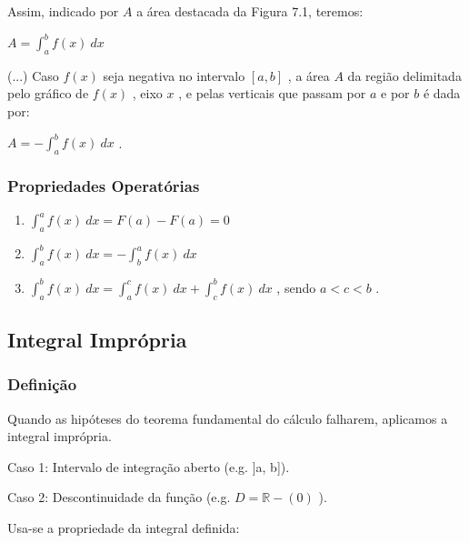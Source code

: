 			Assim, indicado por \textbf{$ A $} a área destacada da Figura 7.1, teremos:
			
			\bigskip

			{\LARGE $A = \int_{a}^{b} f(x) \ dx$}
	
			\bigskip
			
			(...) Caso $ f(x) $ seja negativa no intervalo $ [a, b] $ , a área $ A $ da região delimitada pelo gráfico de $ f(x) $ , eixo $ x $ , e pelas verticais que passam por $ a $ e por $ b $ é dada por:

			\bigskip

			{\LARGE $A = - \int_{a}^{b} f(x) \ dx$} .

		\subsubsection{Propriedades Operatórias \cite{lucchesi}}
		
			\begin{enumerate}[label=(P\arabic*)]
			
				\item {\Large $\int_{a}^{a} f(x) \ dx = F(a) - F(a) = 0$}
				
				\item {\Large $\int_{a}^{b} f(x) \ dx = - \int_{b}^{a} f(x) \ dx$}
			
				\item {\Large $\int_{a}^{b} f(x) \ dx = \int_{a}^{c} f(x) \ dx + \int_{c}^{b} f(x) \ dx $} , sendo $ a < c < b$ .
		
			\end{enumerate}
	
	\subsection{Integral Imprópria \cite{lucchesi}}
	
		\subsubsection{Definição \cite{lucchesi}}
	
			Quando as hipóteses do teorema fundamental do cálculo falharem, aplicamos a integral imprópria.
		
			Caso 1: Intervalo de integração aberto (e.g. ]a, b]).
			
			Caso 2: Descontinuidade da função (e.g. $ D = \mathbb{R} - (0) $ ).
		
			Usa-se a propriedade da integral definida:
		
